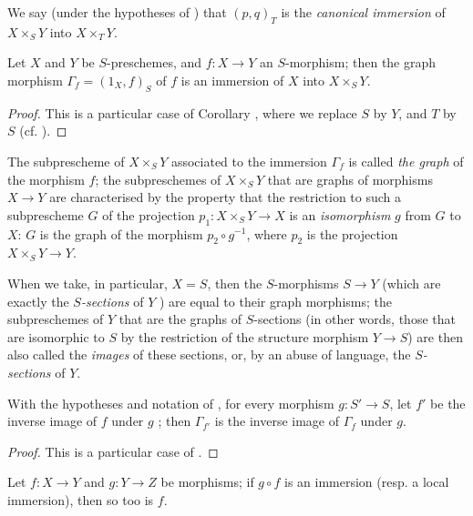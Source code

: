 We say (under the hypotheses of ) that $(p,q)_T$ is the \emph{canonical immersion} of $X\times_S Y$ into $X\times_T Y$.

\begin{corollary}[5.3.11]
\label{I.5.3.11}
Let $X$ and $Y$ be $S$-preschemes, and $f:X\to Y$ an $S$-morphism;
then the graph morphism $\Gamma_f=(1_X,f)_S$ of $f$  is an immersion of $X$ into $X\times_S Y$.
\end{corollary}

\begin{proof}
This is a particular case of Corollary , where we replace $S$ by $Y$, and $T$ by $S$ (cf. ).
\end{proof}

The subprescheme of $X\times_S Y$ associated to the immersion $\Gamma_f$  is called \emph{the graph} of the morphism $f$;
the subpreschemes of $X\times_S Y$ that are graphs of morphisms $X\to Y$ are characterised by the property that the restriction to such a subprescheme $G$ of the projection $p_1:X\times_S Y\to X$ is an \emph{isomorphism} $g$ from $G$ to $X$:
$G$ is the graph of the morphism $p_2\circ g^{-1}$, where $p_2$ is the projection $X\times_S Y\to Y$.

When we take, in particular, $X=S$, then the $S$-morphisms $S\to Y$ (which are exactly the \emph{$S$-sections} of $Y$ ) are equal to their graph morphisms;
the subpreschemes of $Y$ that are the graphs of $S$-sections (in other words, those that are isomorphic to $S$ by the restriction of the structure morphism $Y\to S$) are then also called the \emph{images} of these sections, or, by an abuse of language, the \emph{$S$-sections} of $Y$.

\begin{corollary}[5.3.12]
\label{I.5.3.12}
With the hypotheses and notation of , for every morphism $g:S'\to S$, let $f'$ be the inverse image of $f$ under $g$ ;
then $\Gamma_{f'}$ is the inverse image of $\Gamma_f$ under $g$.
\end{corollary}

\begin{proof}
This is a particular case of .
\end{proof}

\begin{corollary}[5.3.13]
\label{I.5.3.13}
Let $f:X\to Y$ and $g:Y\to Z$ be morphisms;
if $g\circ f$ is an immersion (resp. a local immersion), then so too is $f$.
\end{corollary}

